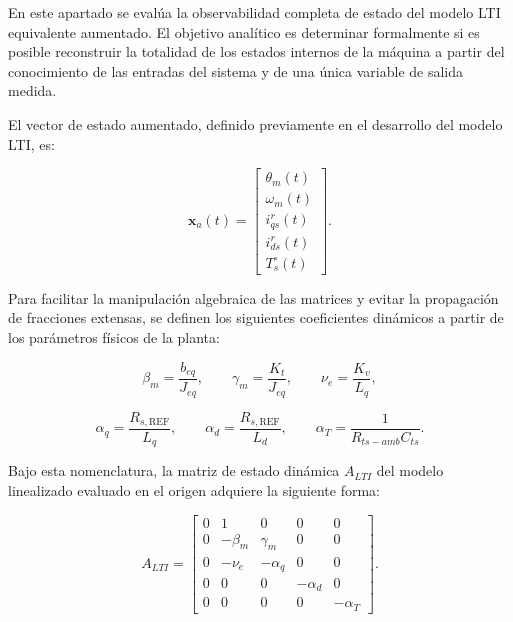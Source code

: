 \documentclass[10pt,a4paper]{article}
\begin{document}
En este apartado se evalúa la observabilidad completa de estado del modelo LTI equivalente aumentado. El objetivo analítico es determinar formalmente si es posible reconstruir la totalidad de los estados internos de la máquina a partir del conocimiento de las entradas del sistema y de una única variable de salida medida.

El vector de estado aumentado, definido previamente en el desarrollo del modelo LTI, es:

\begin{equation}
    \mathbf{x}_a(t)=
    \begin{bmatrix}
        \theta_m(t)\\
        \omega_m(t)\\
        i_{qs}^r(t)\\
        i_{ds}^r(t)\\
        T_s^\circ(t)
    \end{bmatrix}.
	\label{eq:vector_estado_aumentado}
\end{equation}

Para facilitar la manipulación algebraica de las matrices y evitar la propagación de fracciones extensas, 
se definen los siguientes coeficientes dinámicos a partir de los parámetros físicos de la planta:

\begin{equation*}
    \beta_m = \frac{b_{eq}}{J_{eq}}, \qquad 
    \gamma_m = \frac{K_t}{J_{eq}}, \qquad 
    \nu_e = \frac{K_v}{L_q},
\end{equation*}

\begin{equation*}
    \alpha_q = \frac{R_{s,\mathrm{REF}}}{L_q}, \qquad 
    \alpha_d = \frac{R_{s,\mathrm{REF}}}{L_d}, \qquad 
    \alpha_T = \frac{1}{R_{ts-amb}C_{ts}}.
\end{equation*}

Bajo esta nomenclatura, la matriz de estado dinámica $A_{LTI}$ del modelo linealizado evaluado en el origen adquiere la siguiente forma:

\begin{equation}
    A_{LTI} =
    \begin{bmatrix}
        0 & 1 & 0 & 0 & 0\\[2mm]
        0 & -\beta_m & \gamma_m & 0 & 0\\[2mm]
        0 & -\nu_e & -\alpha_q & 0 & 0\\[2mm]
        0 & 0 & 0 & -\alpha_d & 0\\[2mm]
        0 & 0 & 0 & 0 & -\alpha_T
    \end{bmatrix}.
    \label{eq:matriz_A_LTI_alias}
\end{equation}
\end{document}
